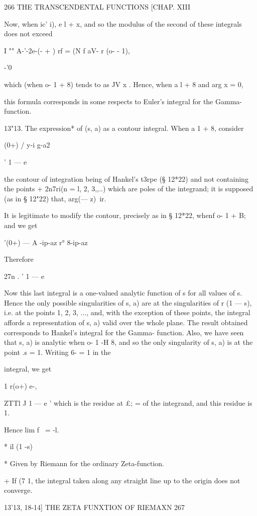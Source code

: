 266 THE TRANSCENDENTAL FUNCTIONS [CHAP. XIII

Now, when ic' i), e l + x, and so the modulus of the second of these
integrals does not exceed

I "" A-'-2e-(- + ) rf = (N f aV- r (o- - 1),

-'0

which (when o- 1 + 8) tends to as JV x . Hence, when a l + 8 and arg x
= 0,

this formula corresponds in some respects to Euler's integral for the
Gamma- function.

13"13. The expression* of (s, a) as a contour integral. When a 1 + 8,
consider

(0+) / y-i g-a2

' 1 — e

the contour of integration being of Hankel's t3rpe (§ 12*22) and not
containing the points + 2n7ri(n = l, 2, 3,,..) which are poles of the
integrand; it is supposed (as in § 12"22) that, arg(— z)\ ir.

It is legitimate to modify the contour, precisely as in § 12*22, whenf
o- 1 + B; and we get

'(0+) — A -ip-az r° 8-ip-az

Therefore

27n . ' 1 — e

Now this last integral is a one-valued analytic function of s for all
values of s. Hence the only possible singularities of s, a) are at the
singularities of r (1 — s), i.e. at the points 1, 2, 3, ..., and, with
the exception of these points, the integral affords a representation
of s, a) valid over the whole plane. The result obtained corresponds
to Hankel's integral for the Gamma- function. Also, we have seen that
s, a) is analytic when o- 1 -H 8, and so the only singularity of s, a)
is at the point .s = 1. Writing 6- = 1 in the

integral, we get

1 r(o+) e-,

ZTTl J 1 — e ' which is the residue at £; = of the integrand, and this
residue is 1.

Hence lim f \ = -l.

* il (1 -s)

* Given by Riemann for the ordinary Zeta-function.

+ If (7 1, the integral taken along any straight line up to the origin
does not converge.

13'13, 18-14] THE ZETA FUNXTION OF RIEMAXN 267

